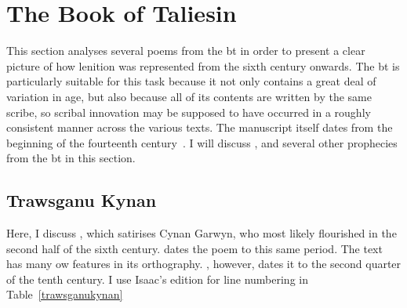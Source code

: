 \section{The Book of Taliesin}\label{sectiontaliesin}
This section analyses several poems from the \gls{bt} in order to present a clear picture of how lenition was represented from the sixth century onwards. The \gls{bt} is particularly suitable for this task because it not only contains a great deal of variation in age, but also because all of its contents are written by the same scribe, so scribal innovation may be supposed to have occurred in a roughly consistent manner across the various texts.  The manuscript itself dates from the beginning of the fourteenth century~\autocite[79]{huws_medieval_2000}. I will discuss , and several other prophecies from the \gls{bt} in this section.


\subsection{Trawsganu Kynan}
Here, I discuss , which satirises Cynan Garwyn, who most likely flourished in the second half of the sixth century. \Textcite{williams_canu_1960} dates the poem to this same period. The text has many \gls{ow} features in its orthography.  \Textcite[178]{isaac_trawsganu_1999}, however, dates it to the second quarter of the tenth century. I use Isaac's edition for line numbering in Table~\ref{trawsganukynan}


